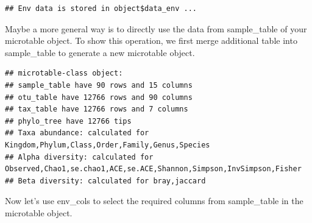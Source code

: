 \documentclass[
]{book}
\newenvironment{Shaded}{\begin{snugshade}}{\end{snugshade}}
\newcommand{\AttributeTok}[1]{\textcolor[rgb]{0.77,0.63,0.00}{#1}}
\newcommand{\CommentTok}[1]{\textcolor[rgb]{0.56,0.35,0.01}{\textit{#1}}}
\newcommand{\DecValTok}[1]{\textcolor[rgb]{0.00,0.00,0.81}{#1}}
\newcommand{\FunctionTok}[1]{\textcolor[rgb]{0.00,0.00,0.00}{#1}}
\newcommand{\NormalTok}[1]{#1}
\newcommand{\OtherTok}[1]{\textcolor[rgb]{0.56,0.35,0.01}{#1}}
\newcommand{\SpecialCharTok}[1]{\textcolor[rgb]{0.00,0.00,0.00}{#1}}
\begin{document}
\begin{Shaded}
\end{Shaded}

\begin{verbatim}
## Env data is stored in object$data_env ...
\end{verbatim}

Maybe a more general way is to directly use the data from sample\_table of your microtable object.
To show this operation, we first merge additional table into sample\_table to generate a new microtable object.

\begin{Shaded}
\end{Shaded}

\begin{verbatim}
## microtable-class object:
## sample_table have 90 rows and 15 columns
## otu_table have 12766 rows and 90 columns
## tax_table have 12766 rows and 7 columns
## phylo_tree have 12766 tips
## Taxa abundance: calculated for Kingdom,Phylum,Class,Order,Family,Genus,Species 
## Alpha diversity: calculated for Observed,Chao1,se.chao1,ACE,se.ACE,Shannon,Simpson,InvSimpson,Fisher 
## Beta diversity: calculated for bray,jaccard
\end{verbatim}

Now let's use env\_cols to select the required columns from sample\_table in the microtable object.

\begin{Shaded}
\end{Shaded}
\end{document}

